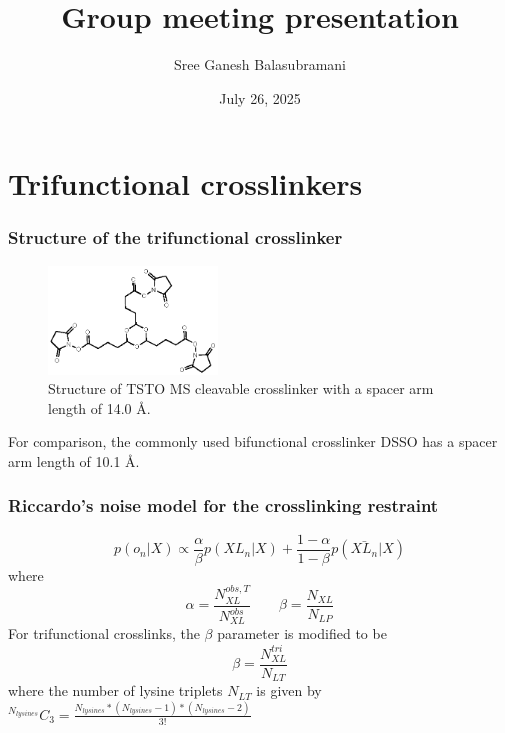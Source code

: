 \documentclass[a4paper,8pt]{beamer}
\title{Group meeting presentation}
\author[S. G. Balasubramani]{Sree Ganesh Balasubramani}
\institute[UCSF]{Echeverria \& {\v S}ali Groups \\ University of California, San Francisco}
\date{July 26, 2025}
\begin{document}
\maketitle

\section{Trifunctional crosslinkers}
\begin{frame}
  \frametitle{Structure of the trifunctional crosslinker}
  
  \begin{figure}
    \centering
    \includegraphics[width=0.4\textwidth]{figures/tri-linker.eps}
    \caption{Structure of TSTO MS cleavable crosslinker with a spacer arm length 
    of 14.0 \AA.}
  \end{figure}
  \begin{block}{}
    For comparison, the commonly used bifunctional crosslinker
  DSSO has a spacer arm length of 10.1 \AA.
    \end{block}
\end{frame}
\begin{frame}
\frametitle{Riccardo's noise model for the crosslinking restraint}
\begin{equation}
p(o_n|X) \propto \frac{\alpha}{\beta}p(XL_n|X) + \frac{1 - \alpha}{1 - \beta}p(\bar{XL_n}|X)
\end{equation}
where 
\begin{equation}
\alpha = \frac{N^{obs, T}_{XL}}{N^{obs}_{XL}} \qquad \beta = \frac{N_{XL}}{N_{LP}}
\end{equation}
For trifunctional crosslinks, the $\beta$ parameter is modified to be 
\begin{equation}
\beta = \frac{N_{XL}^{tri}}{N_{LT}}
\end{equation}
where the number of lysine triplets $N_{LT}$ is 
given by $^{N_{lysines}}C_3 = \frac{N_{lysines}*(N_{lysines}-1)*(N_{lysines}-2)}{3!}$
\end{frame}
\end{document}
